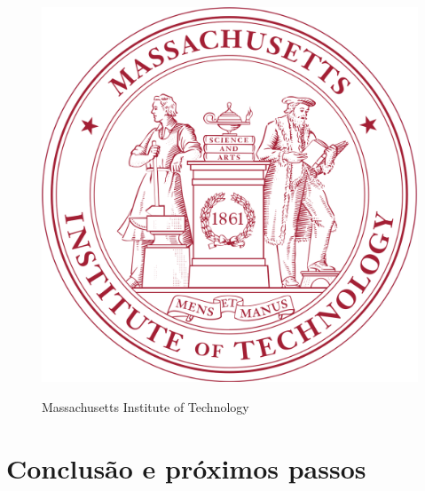 \documentclass[12pt]{article} %
\begin{document}
\begin{figure}[H]
\centering
\includegraphics[scale=0.2]{pictures/mitLogo.png}\\
\caption{Massachusetts Institute of Technology}
\end{figure}


\section{Conclusão e próximos passos}
\end{document}
